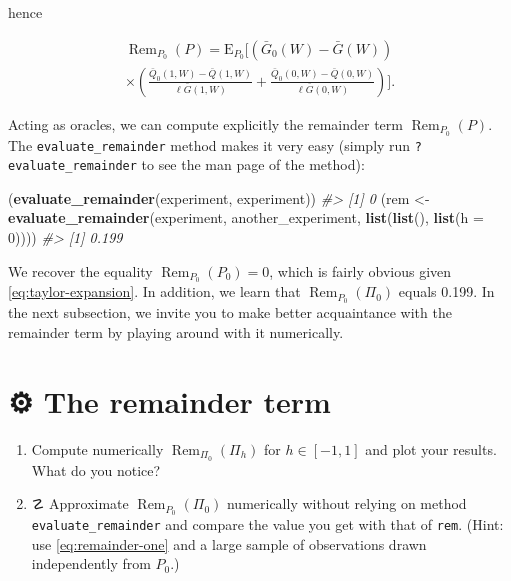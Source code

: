 \documentclass[11pt,openright,twoside]{book}
\newenvironment{Shaded}{\begin{snugshade}}{\end{snugshade}}
\newcommand{\CommentTok}[1]{\textcolor[rgb]{0.56,0.35,0.01}{\textit{#1}}}
\newcommand{\DataTypeTok}[1]{\textcolor[rgb]{0.13,0.29,0.53}{#1}}
\newcommand{\DecValTok}[1]{\textcolor[rgb]{0.00,0.00,0.81}{#1}}
\newcommand{\KeywordTok}[1]{\textcolor[rgb]{0.13,0.29,0.53}{\textbf{#1}}}
\newcommand{\NormalTok}[1]{#1}
\newcommand{\StringTok}[1]{\textcolor[rgb]{0.31,0.60,0.02}{#1}}
\DeclareMathOperator{\Rem}{Rem}
\newcommand{\gear}{\usebox{\gearbox}\;}
\DeclareRobustCommand{\stixdanger}{%
  {\usefont{U}{stixbbit}{m}{it}\symbol{"F6}}%
}
\newcommand{\Exp}{\textrm{E}}
\newcommand{\Gbar}{\bar{G}}
\newcommand{\Qbar}{\bar{Q}}
\theoremstyle{definition}
\theoremstyle{definition}
\theoremstyle{definition}
\theoremstyle{remark}
\begin{document}
hence

\begin{multline} 
\Rem_{P_0}(P)=   \Exp_{P_0}   \Bigg[   \left(\Gbar_0(W)   -
\Gbar(W)\right) \\          \times          \left(\frac{\Qbar_0(1,W)           -
\Qbar(1,W)}{\ell\Gbar(1,W)} + \frac{\Qbar_0(0,W) - \Qbar(0,W)}{\ell\Gbar(0,W)}
\right) \Bigg]. \label{eq:remainder} 
\end{multline}

Acting as oracles, we can compute explicitly the remainder term
\(\Rem_{P_0}(P)\). The \texttt{evaluate\_remainder} method makes it very easy (simply
run \texttt{?evaluate\_remainder} to see the man page of the method):

\begin{Shaded}
\begin{Highlighting}[]
\NormalTok{(}\KeywordTok{evaluate_remainder}\NormalTok{(experiment, experiment))}
\CommentTok{#> [1] 0}
\NormalTok{(rem <-}\StringTok{ }\KeywordTok{evaluate_remainder}\NormalTok{(experiment, another_experiment,}
                           \KeywordTok{list}\NormalTok{(}\KeywordTok{list}\NormalTok{(), }\KeywordTok{list}\NormalTok{(}\DataTypeTok{h =} \DecValTok{0}\NormalTok{))))}
\CommentTok{#> [1] 0.199}
\end{Highlighting}
\end{Shaded}

We recover the equality \(\Rem_{P_{0}} (P_{0}) = 0\), which is fairly obvious
given \eqref{eq:taylor-expansion}. In addition, we learn that \(\Rem_{P_{0}} (\Pi_{0})\) equals 0.199. In the next subsection, we invite you to
make better acquaintance with the remainder term by playing around with it
numerically.

\hypertarget{exo-remainder-term}{%
\section{\texorpdfstring{⚙ \gear The remainder term}{⚙ The remainder term}}\label{exo-remainder-term}}

\begin{enumerate}
\def\labelenumi{\arabic{enumi}.}
\item
  Compute numerically \(\Rem_{\Pi_0}(\Pi_h)\) for \(h \in [-1,1]\) and plot your
  results. What do you notice?
\item
  ☡ \stixdanger{} Approximate \(\Rem_{P_{0}} (\Pi_{0})\) numerically
  without relying on method \texttt{evaluate\_remainder} and compare the value you get
  with that of \texttt{rem}. (Hint: use \eqref{eq:remainder-one} and a large sample of
  observations drawn independently from \(P_{0}\).)
\end{enumerate}
\end{document}
